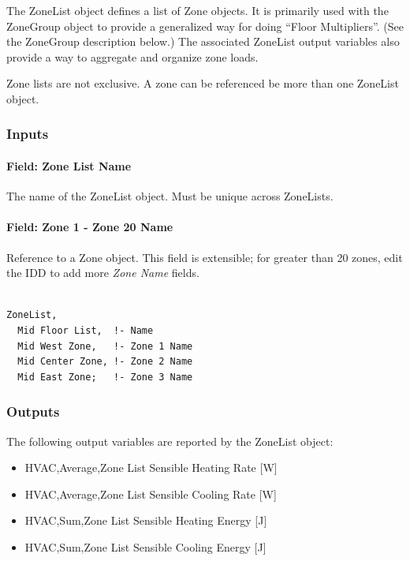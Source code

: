 The ZoneList object defines a list of Zone objects. It is primarily used with the ZoneGroup object to provide a generalized way for doing ``Floor Multipliers''. (See the ZoneGroup description below.) The associated ZoneList output variables also provide a way to aggregate and organize zone loads.

Zone lists are not exclusive. A zone can be referenced be more than one ZoneList object.

\subsubsection{Inputs}\label{inputs-1-045}

\paragraph{Field: Zone List Name}\label{field-zone-list-name-000}

The name of the ZoneList object. Must be unique across ZoneLists.

\paragraph{Field: Zone 1 - Zone 20 Name}\label{field-zone-1---zone-20-name}

Reference to a Zone object. This field is extensible; for greater than 20 zones, edit the IDD to add more \emph{Zone Name} fields.

\begin{lstlisting}

ZoneList,
  Mid Floor List,  !- Name
  Mid West Zone,   !- Zone 1 Name
  Mid Center Zone, !- Zone 2 Name
  Mid East Zone;   !- Zone 3 Name
\end{lstlisting}

\subsubsection{Outputs}\label{outputs-1-028}

The following output variables are reported by the ZoneList object:

\begin{itemize}
\item
  HVAC,Average,Zone List Sensible Heating Rate {[}W{]}
\item
  HVAC,Average,Zone List Sensible Cooling Rate {[}W{]}
\item
  HVAC,Sum,Zone List Sensible Heating Energy {[}J{]}
\item
  HVAC,Sum,Zone List Sensible Cooling Energy {[}J{]}
\end{itemize}

